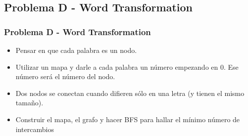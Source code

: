 \documentclass{beamer}
\begin{document}
	\subsection{Problema D - Word Transformation}
	\begin{frame}
		\frametitle{Problema D - Word Transformation}
		\begin{itemize}
			\item Pensar en que cada palabra es un nodo.
			\item Utilizar un mapa y darle a cada palabra un número empezando en 0. Ese número será el número del nodo.
			\item Dos nodos se conectan cuando difieren sólo en una letra (y tienen el mismo tamaño).
			\item Construir el mapa, el grafo y hacer BFS para hallar el mínimo número de intercambios
		\end{itemize}
	\end{frame}
	
\end{document}
